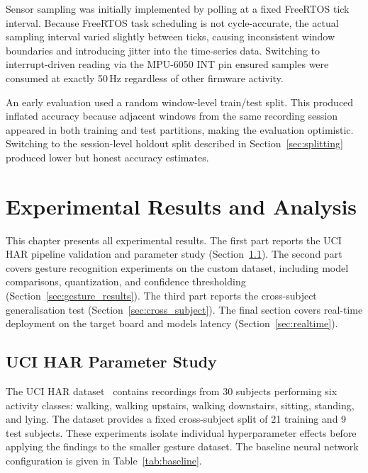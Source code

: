 Sensor sampling was initially implemented by polling at a fixed FreeRTOS tick interval. Because FreeRTOS task scheduling is not cycle-accurate, the actual sampling interval varied slightly between ticks, causing inconsistent window boundaries and introducing jitter into the time-series data. Switching to interrupt-driven reading via the MPU-6050 INT pin ensured samples were consumed at exactly 50\,Hz regardless of other firmware activity.
 
An early evaluation used a random window-level train/test split. This produced inflated accuracy because adjacent windows from the same recording session appeared in both training and test partitions, making the evaluation optimistic. Switching to the session-level holdout split described in Section~\ref{sec:splitting} produced lower but honest accuracy estimates.
 

\chapter{Experimental Results and Analysis}
\label{chap:results}

This chapter presents all experimental results. The first part reports the UCI HAR pipeline validation and parameter study (Section~\ref{sec:uci_results}). The second part covers gesture recognition experiments on the custom dataset, including model comparisons, quantization, and confidence thresholding (Section~\ref{sec:gesture_results}). The third part reports the cross-subject generalisation test (Section~\ref{sec:cross_subject}). The final section covers real-time deployment on the target board and models latency (Section~\ref{sec:realtime}).

\section{UCI HAR Parameter Study}
\label{sec:uci_results}

The UCI HAR dataset~\cite{anguita2013uci} contains recordings from 30 subjects performing six activity classes: walking, walking upstairs, walking downstairs, sitting, standing, and lying. The dataset provides a fixed cross-subject split of 21 training and 9 test subjects. These experiments isolate individual hyperparameter effects before applying the findings to the smaller gesture dataset. The baseline neural network configuration is given in Table~\ref{tab:baseline}. 
 
